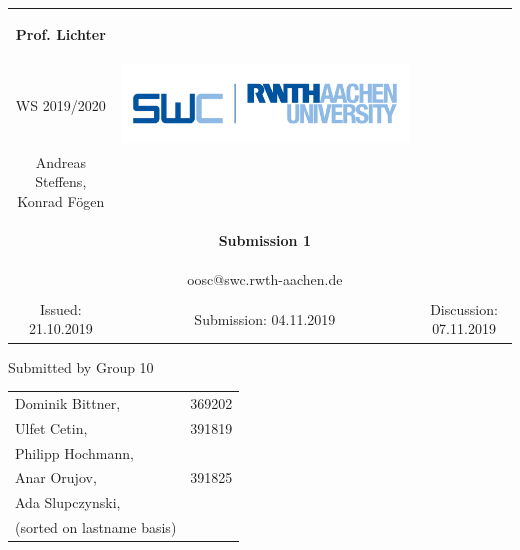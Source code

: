 \documentclass[a4paper,12pt,oneside]{scrreprt}
\begin{document}
	
\begin{tabular}{ccc}
	\begin{large} \textbf{Prof. Lichter} \end{large} &
	
	\begin{minipage}[H]{3.5cm}
	\centering
		\begin{large} OOSC \end{large} \\
		\begin{large} WS 2019/2020 \end{large}
	\end{minipage} &
	
	\begin{minipage}[H]{4cm}
		\includegraphics[keepaspectratio,width=\textwidth,angle=0]{images/swc.png}
	\end{minipage} \\
Andreas Steffens, Konrad F\"ogen &  &  \\
& \begin{huge} \textbf{Submission 1} \end{huge}&  \\
& oosc@swc.rwth-aachen.de &  \\
& & \\
Issued: 21.10.2019 &
Submission: 04.11.2019 &
Discussion: 07.11.2019 \\
\end{tabular}
\newline \newline \newline
\centering
Submitted by Group 10

\begin{tabular}{ll}
	Dominik Bittner, & 369202 \\
	Ulfet Cetin, & 391819\\
 	Philipp Hochmann, \\
 	Anar Orujov, & 391825\\
 	Ada Slupczynski, \\
 	(sorted on lastname basis)
\end{tabular}
\end{document}
